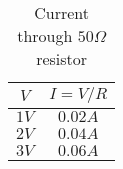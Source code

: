 \begin{table}[htp]
	\begin{center}
	\caption{Current through $50 \Omega$ resistor}
	\label{tab:table_ohm}
		\begin{tabular}{cc}
		\toprule
			{$V$} & {$I=V/R$}\\
			\midrule
			$1 V$ & $0.02 A$\\
			$2 V$ & $0.04 A$\\
			$3 V$ & $0.06 A$\\
		\bottomrule
		\end{tabular}
	\end{center}
\end{table}